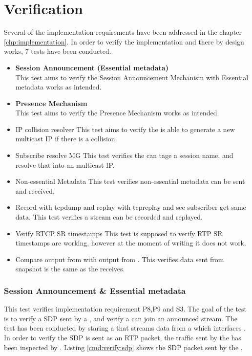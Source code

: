 \chapter{Verification} \label{sec:design:verification}
Several of the implementation requirements have been addressed in the chapter \ref{chp:implementation}. In order to verify the implementation and there by design works, 7 tests have been conducted.

\begin{itemize}
	\item \textbf{Session Announcement (Essential metadata)}\\
This test aims to verify the Session Announcement Mechanism with Essential metadata works as intended.
	\item \textbf{Presence Mechanism}\\
This test aims to verify the Presence Mechanism works as intended.
	\item IP collision resolver
This test aims to verify the \pub{} is able to generate a new multicast IP if there is a collision.
	\item Subscribe resolve MG
This test verifies the \sub{} can tage a session name, and resolve that into an multicast IP.
	\item Non-essential Metadata
This test verifies non-essential metadata can be sent and received.
	\item Record with tcpdump and replay with tcpreplay and see subscriber get same data.
This test verifies a stream can be recorded and replayed.
	\item Verify RTCP SR timestamps
This test is supposed to verify RTP SR timestamps are working, however at the moment of writing it does not work.
	\item Compare output from \con{} with output from .
This verifies data sent from snapshot is the same as the \con{} receives.
\end{itemize}

\subsection{Session Announcement \& Essential metadata} \label{sec:verify:sessionannouncement}
This test verifies implementation requirement P8,P9 and S3. The goal of the test is to verify a SDP sent by a \pub{}, and verify a \sub{} can join an announced stream. 
The test has been conducted by staring a \pub{} that streams data from a \con{} which interfaces . In order to verify the SDP is sent as an RTP packet, the traffic sent by the \pub{} has been inspected by . Listing \ref{cmd:verify:sdp} shows the SDP packet sent by the \pub{}.

